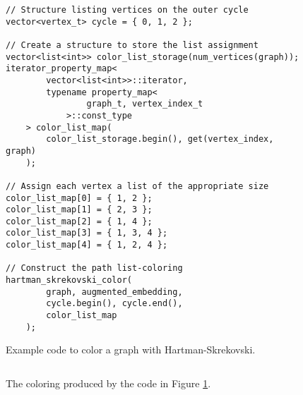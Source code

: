 \documentclass[letterpaper, 12pt]{article}
\theoremstyle{definition}
\theoremstyle{definition}
\theoremstyle{thm}
\theoremstyle{definition}
\begin{document}
\begin{figure}
\begin{lstlisting}[frame=single]
// Structure listing vertices on the outer cycle
vector<vertex_t> cycle = { 0, 1, 2 };

// Create a structure to store the list assignment
vector<list<int>> color_list_storage(num_vertices(graph));
iterator_property_map<
        vector<list<int>>::iterator,
        typename property_map<
                graph_t, vertex_index_t
            >::const_type
    > color_list_map(
        color_list_storage.begin(), get(vertex_index, graph)
    );

// Assign each vertex a list of the appropriate size
color_list_map[0] = { 1, 2 };
color_list_map[1] = { 2, 3 };
color_list_map[2] = { 1, 4 };
color_list_map[3] = { 1, 3, 4 };
color_list_map[4] = { 1, 2, 4 };

// Construct the path list-coloring
hartman_skrekovski_color(
        graph, augmented_embedding,
        cycle.begin(), cycle.end(),
        color_list_map
    );
\end{lstlisting}
\caption{Example code to color a graph with Hartman-Skrekovski.}
\label{example_hartman}
\end{figure}

\begin{figure}
\begin{center}
$\qquad$
\end{center}
\caption{The coloring produced by the code in Figure \ref{example_hartman}.}
\end{figure}
\end{document}
